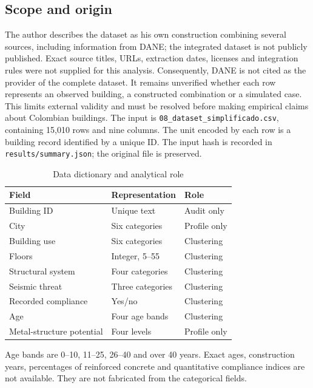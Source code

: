 \documentclass[conference]{IEEEtran}
\begin{document}
\subsection{Scope and origin}
The author describes the dataset as his own construction combining several sources, including information from DANE; the integrated dataset is not publicly published. Exact source titles, URLs, extraction dates, licenses and integration rules were not supplied for this analysis. Consequently, DANE is not cited as the provider of the complete dataset. It remains unverified whether each row represents an observed building, a constructed combination or a simulated case. This limits external validity and must be resolved before making empirical claims about Colombian buildings.
The input is \texttt{08\_dataset\_simplificado.csv}, containing 15,010 rows and nine columns. The unit encoded by each row is a building record identified by a unique ID. The input hash is recorded in \texttt{results/summary.json}; the original file is preserved.
\begin{table}[ht]
\caption{Data dictionary and analytical role}
\centering\footnotesize
\begin{tabular}{p{}p{}p{}}\toprule
Field & Representation & Role \\\midrule
Building ID & Unique text & Audit only\\
City & Six categories & Profile only\\
Building use & Six categories & Clustering\\
Floors & Integer, 5--55 & Clustering\\
Structural system & Four categories & Clustering\\
Seismic threat & Three categories & Clustering\\
Recorded compliance & Yes/no & Clustering\\
Age & Four age bands & Clustering\\
Metal-structure potential & Four levels & Profile only\\\bottomrule
\end{tabular}
\end{table}
Age bands are 0--10, 11--25, 26--40 and over 40 years. Exact ages, construction years, percentages of reinforced concrete and quantitative compliance indices are not available. They are not fabricated from the categorical fields.
\end{document}
